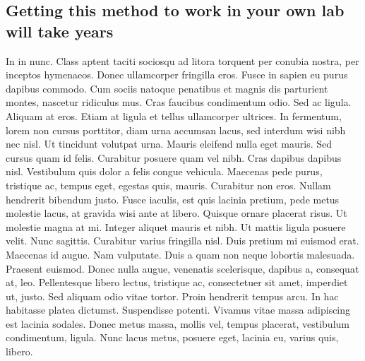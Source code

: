 \documentclass{biorxiv}
\begin{document}
\begin{methods}
\subsection{Getting this method to work in your own lab will take years}
In in nunc. Class aptent taciti sociosqu ad litora torquent per conubia
nostra, per inceptos hymenaeos. Donec ullamcorper fringilla eros. Fusce in
sapien eu purus dapibus commodo. Cum sociis natoque penatibus et magnis dis
parturient montes, nascetur ridiculus mus. Cras faucibus condimentum odio. Sed
ac ligula. Aliquam at eros. Etiam at ligula et tellus ullamcorper ultrices. In
fermentum, lorem non cursus porttitor, diam urna accumsan lacus, sed interdum
wisi nibh nec nisl. Ut tincidunt volutpat urna. Mauris eleifend nulla eget
mauris. Sed cursus quam id felis. Curabitur posuere quam vel nibh. Cras
dapibus dapibus nisl. Vestibulum quis dolor a felis congue vehicula. Maecenas
pede purus, tristique ac, tempus eget, egestas quis, mauris. Curabitur non
eros. Nullam hendrerit bibendum justo. Fusce iaculis, est quis lacinia
pretium, pede metus molestie lacus, at gravida wisi ante at libero. Quisque
ornare placerat risus. Ut molestie magna at mi. Integer aliquet mauris et
nibh. Ut mattis ligula posuere velit. Nunc sagittis. Curabitur varius
fringilla nisl. Duis pretium mi euismod erat. Maecenas id augue. Nam
vulputate. Duis a quam non neque lobortis malesuada. Praesent euismod. Donec
nulla augue, venenatis scelerisque, dapibus a, consequat at, leo. Pellentesque
libero lectus, tristique ac, consectetuer sit amet, imperdiet ut, justo. Sed
aliquam odio vitae tortor. Proin hendrerit tempus arcu. In hac habitasse
platea dictumst. Suspendisse potenti. Vivamus vitae massa adipiscing est
lacinia sodales. Donec metus massa, mollis vel, tempus placerat, vestibulum
condimentum, ligula. Nunc lacus metus, posuere eget, lacinia eu, varius quis,
libero.


\end{methods}
\end{document}
